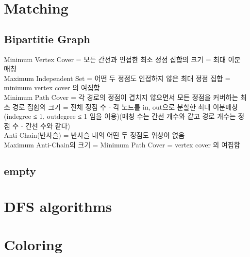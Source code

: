 \section{Matching}

	\subsection{Bipartitie Graph}
		Minimum Vertex Cover = 모든 간선과 인접한 최소 정점 집합의 크기 = 최대 이분 매칭\\
		Maximum Independent Set = 어떤 두 정점도 인접하지 않은 최대 정점 집합 = minimum vertex cover 의 여집합\\
		Minimum Path Cover = 각 경로의 정점이 겹치지 않으면서 모든 정점을 커버하는 최소 경로 집합의 크기 = 전체 정점 수 - 각 노드를 in, out으로 분할한 최대 이분매칭(indegree ≤ 1, outdegree ≤ 1 임을 이용)(매칭 수는 간선 개수와 같고 경로 개수는 정점 수 - 간선 수와 같다)\\
		Anti-Chain(반사슬) = 반사슬 내의 어떤 두 정점도 위상이 없음\\
		Maximum Anti-Chain의 크기 = Minimum Path Cover = vertex cover 의 여집합

	\subsection{empty}


\section{DFS algorithms}

\section{Coloring}


